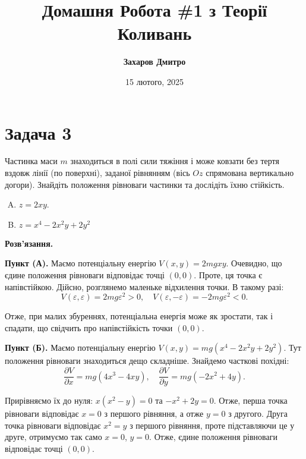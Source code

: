\documentclass{hw_template}
\title{\bfseries Домашня Робота \#1 з Теорії Коливань}
\author{\bfseries Захаров Дмитро}
\date{15 лютого, 2025}
\begin{document}
\pagestyle{fancy}

\maketitle

\section{Задача 3}


\begin{problem}
    Частинка маси $m$ знаходиться в полі сили тяжіння і може ковзати 
    без тертя вздовж лінії (по поверхні), заданої рівнянням (вісь 
    $Oz$ спрямована вертикально догори). Знайдіть положення рівноваги
    частинки та дослідіть їхню стійкість.
    \begin{enumerate}[(A)]
        \item $z=2xy$.
        \item $z=x^4 - 2x^2y + 2y^2$
    \end{enumerate}
\end{problem}

\textbf{Розв'язання.} 

\textbf{Пункт (А).} Маємо потенціальну енергію $V(x,y) = 2mgxy$. Очевидно, що
єдине положення рівноваги відповідає точці $(0,0)$. Проте, ця точка є напівстійкою. 
Дійсно, розглянемо маленьке відхилення точки. В такому разі:
\begin{equation*}
    V(\varepsilon, \varepsilon) = 2mg\varepsilon^2 > 0, \quad V(\varepsilon, -\varepsilon) = -2mg\varepsilon^2 < 0.
\end{equation*}

Отже, при малих збуреннях, потенціальна енергія може як зростати, так і спадати,
що свідчить про напівстійкість точки $(0,0)$.

\textbf{Пункт (Б).} Маємо потенціальну енергію $V(x,y) = mg(x^4 - 2x^2y + 2y^2)$.
Тут положення рівноваги знаходиться дещо складніше. Знайдемо часткові похідні:
\begin{equation*}
    \frac{\partial V}{\partial x} = mg(4x^3-4xy), \quad \frac{\partial V}{\partial y} = mg(-2x^2+4y).
\end{equation*}

Прирівняємо їх до нуля: $x(x^2-y)=0$ та $-x^2+2y=0$. Отже, перша точка рівноваги 
відповідає $x=0$ з першого рівняння, а отже $y=0$ з другого. Друга точка рівноваги
відповідає $x^2=y$ з першого рівняння, проте підставляючи це у друге, отримуємо
так само $x=0$, $y=0$. Отже, єдине положення рівноваги відповідає точці $(0,0)$.
\end{document}
